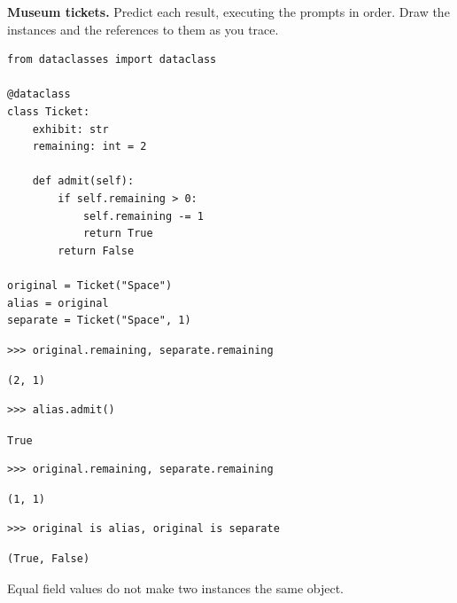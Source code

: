 \begin{blocksection}
\question \textbf{Museum tickets.} Predict each result, executing the prompts
in order. Draw the instances and the references to them as you trace.

\begin{lstlisting}
from dataclasses import dataclass

@dataclass
class Ticket:
    exhibit: str
    remaining: int = 2

    def admit(self):
        if self.remaining > 0:
            self.remaining -= 1
            return True
        return False

original = Ticket("Space")
alias = original
separate = Ticket("Space", 1)
\end{lstlisting}
\end{blocksection}

\begin{blocksection}
\begin{lstlisting}
>>> original.remaining, separate.remaining
\end{lstlisting}
\begin{solution}[.35in]
\lstinline{(2, 1)}
\end{solution}
\end{blocksection}

\begin{blocksection}
\begin{lstlisting}
>>> alias.admit()
\end{lstlisting}
\begin{solution}[.35in]
\lstinline{True}
\end{solution}
\end{blocksection}

\begin{blocksection}
\begin{lstlisting}
>>> original.remaining, separate.remaining
\end{lstlisting}
\begin{solution}[.35in]
\begin{lstlisting}
(1, 1)
\end{lstlisting}
\end{solution}
\begin{lstlisting}
>>> original is alias, original is separate
\end{lstlisting}
\begin{solution}[.35in]
\begin{lstlisting}
(True, False)
\end{lstlisting}
Equal field values do not make two instances the same object.
\end{solution}
\end{blocksection}

